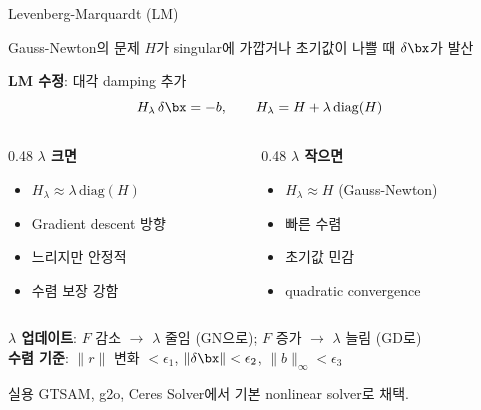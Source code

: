 \begin{frame}{Levenberg-Marquardt (LM)}
  \begin{block}{Gauss-Newton의 문제}
    $H$가 singular에 가깝거나 초기값이 나쁠 때 $\delta\bx$가 발산
  \end{block}
  \pause
  \textbf{LM 수정}: 대각 damping 추가
  \[
    H_\lambda\,\delta\bx = -b,
    \qquad
    H_\lambda = H + \lambda\,\mathrm{diag}(H)
  \]
  \pause
  \begin{columns}[T]
    \begin{column}{0.48\textwidth}
      \textbf{$\lambda$ 크면}
      \begin{itemize}
        \item $H_\lambda \approx \lambda\,\mathrm{diag}(H)$
        \item Gradient descent 방향
        \item 느리지만 안정적
        \item 수렴 보장 강함
      \end{itemize}
    \end{column}
    \begin{column}{0.48\textwidth}
      \textbf{$\lambda$ 작으면}
      \begin{itemize}
        \item $H_\lambda \approx H$ (Gauss-Newton)
        \item 빠른 수렴
        \item 초기값 민감
        \item quadratic convergence
      \end{itemize}
    \end{column}
  \end{columns}
  \pause
  \vspace{0.5em}
  \textbf{$\lambda$ 업데이트}: $F$ 감소 $\to$ $\lambda$ 줄임 (GN으로); $F$ 증가 $\to$ $\lambda$ 늘림 (GD로)\\[0.3em]
  \textbf{수렴 기준}: $\|r\|$ 변화 $< \epsilon_1$, $\|\delta\bx\| < \epsilon_2$, $\|b\|_\infty < \epsilon_3$
  \begin{exampleblock}{실용}
    GTSAM, g2o, Ceres Solver에서 기본 nonlinear solver로 채택.
  \end{exampleblock}
\end{frame}

